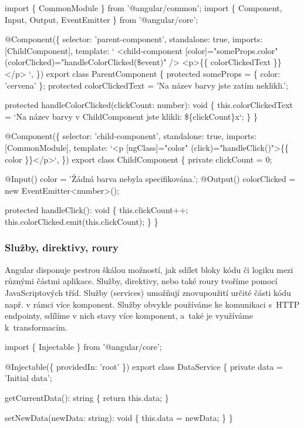 \begin{prog}
import \{ CommonModule \} from '@angular/common';
import \{ Component, Input, Output, EventEmitter \} from '@angular/core';

@Component(\{
  selector: 'parent-component',
  standalone: true,
  imports: [ChildComponent],
  template: `
    <child-component 
      [color]="someProps.color" 
      (colorClicked)="handleColorClicked(\$event)" 
    />
    <p>\{\{ colorClickedText \}\}</p>
  `,
\})
export class ParentComponent \{
  protected someProps = \{ color: 'cervena' \};
  protected colorClickedText = 'Na název barvy jste zatím neklikli.';

  protected handleColorClicked(clickCount: number): void \{
    this.colorClickedText = `Na název barvy 
      v ChildComponent jste klikli: \$\{clickCount\}x`;
  \}
\}

@Component(\{
  selector: 'child-component',
  standalone: true,
  imports: [CommonModule],
  template: `<p [ngClass]="color" (click)="handleClick()">\{\{ color \}\}</p>`,
\})
export class ChildComponent \{
  private clickCount = 0;

  @Input() color = 'Žádná barva nebyla specifikována.';
  @Output() colorClicked = new EventEmitter<number>();

  protected handleClick(): void \{
    this.clickCount++;
    this.colorClicked.emit(this.clickCount);
  \}
\}
\end{prog}

\subsubsection{Služby, direktivy, roury}

Angular disponuje pestrou škálou možností, jak sdílet bloky kódu či logiku mezi různými částmi aplikace. Služby, direktivy, nebo také roury tvoříme pomocí JavaScriptových tříd. 
Služby (services) umožňují znovupoužití určité části kódu např. v rámci více komponent. 
Služby obvykle používáme ke komunikaci s~HTTP endpointy, sdílíme v nich stavy více komponent, a~také je využíváme k~transformacím.\cite{angulardev,learningangular}

\begin{prog}
import \{ Injectable \} from '@angular/core';
  
@Injectable(\{ providedIn: 'root' \})
export class DataService \{
  private data = 'Initial data';

  getCurrentData(): string \{
    return this.data;
  \}
      
  setNewData(newData: string): void \{
    this.data = newData;
  \}
\}
\end{prog}

